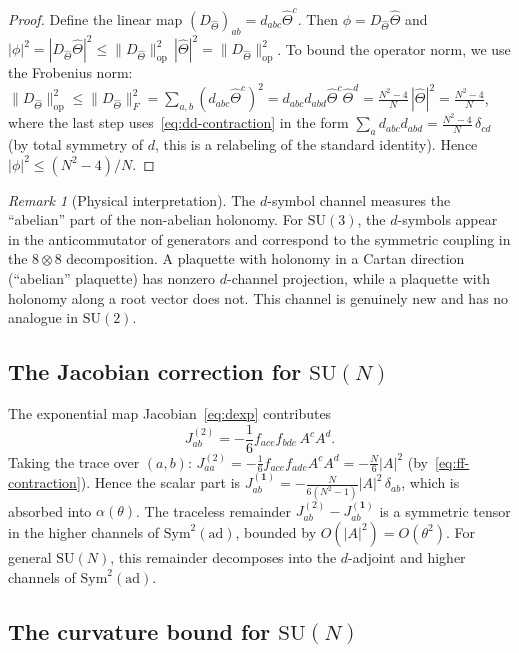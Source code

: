 \documentclass[11pt,a4paper]{article}
\theoremstyle{plain}
\theoremstyle{definition}
\theoremstyle{remark}
\newtheorem{remark}[theorem]{Remark}
\newcommand{\SU}{\mathrm{SU}}
\newcommand{\ad}{\mathrm{ad}}
\newcommand{\Sym}{\mathrm{Sym}}
\newcommand{\op}{\mathrm{op}}
\begin{document}
\begin{proof}
Define the linear map $(D_{\hat\Theta})_{ab} = d_{abc}\hat\Theta^c$.
Then $\phi = D_{\hat\Theta}\hat\Theta$ and
$|\phi|^2 = |D_{\hat\Theta}\hat\Theta|^2
\leq \|D_{\hat\Theta}\|_{\op}^2\,|\hat\Theta|^2
= \|D_{\hat\Theta}\|_{\op}^2$.
To bound the operator norm, we use the Frobenius norm:
$\|D_{\hat\Theta}\|_{\op}^2
\leq \|D_{\hat\Theta}\|_F^2
= \sum_{a,b}(d_{abc}\hat\Theta^c)^2
= d_{abc}d_{abd}\hat\Theta^c\hat\Theta^d
= \frac{N^2-4}{N}\,|\hat\Theta|^2 = \frac{N^2-4}{N}$,
where the last step uses~\eqref{eq:dd-contraction} in the form
$\sum_a d_{abc}d_{abd} = \frac{N^2-4}{N}\,\delta_{cd}$
(by total symmetry of $d$, this is a relabeling of the standard
identity). Hence $|\phi|^2 \leq (N^2-4)/N$.
\end{proof}

\begin{remark}[Physical interpretation]
The $d$-symbol channel measures the ``abelian'' part of the
non-abelian holonomy. For $\SU(3)$, the $d$-symbols appear in the
anticommutator of generators and correspond to the symmetric
coupling in the $8 \otimes 8$ decomposition. A plaquette with
holonomy in a Cartan direction (``abelian'' plaquette) has
nonzero $d$-channel projection, while a plaquette with holonomy
along a root vector does not. This channel is genuinely
new and has no analogue in $\SU(2)$.
\end{remark}


\subsection{The Jacobian correction for $\SU(N)$}

The exponential map Jacobian~\eqref{eq:dexp} contributes
\begin{equation}
J^{(2)}_{ab} = -\frac{1}{6}f_{ace}f_{bde}\,A^c A^d.
\end{equation}
Taking the trace over $(a,b)$:
$J^{(2)}_{aa} = -\frac{1}{6}f_{ace}f_{ade}A^c A^d
= -\frac{N}{6}|A|^2$ (by~\eqref{eq:ff-contraction}).
Hence the scalar part is
$J^{(\mathbf{1})}_{ab} = -\frac{N}{6(N^2-1)}|A|^2\,\delta_{ab}$,
which is absorbed into $\alpha(\theta)$.
The traceless remainder $J^{(2)}_{ab} - J^{(\mathbf{1})}_{ab}$
is a symmetric tensor in the higher channels of $\Sym^2(\ad)$,
bounded by $O(|A|^2) = O(\theta^2)$.
For general $\SU(N)$, this remainder decomposes into the
$d$-adjoint and higher channels of $\Sym^2(\ad)$.


\subsection{The curvature bound for $\SU(N)$}
\end{document}
